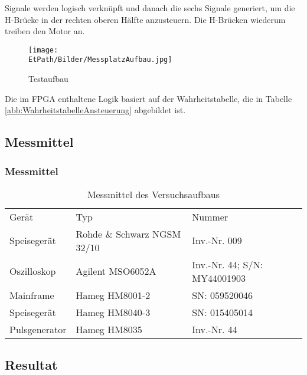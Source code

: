     Signale werden logisch verknüpft und danach die sechs Signale 
    generiert, um die H-Brücke in der rechten oberen Hälfte anzusteuern. 
    Die H-Brücken wiederum treiben den Motor an.
    \begin{figure}[h!]
       	\texttt{[image: \\EtPath/Bilder/MessplatzAufbau.jpg]}
       	\centering
       	\caption{Testaufbau} 
        \label{abb:MessplatzAufbau}
    \end{figure}
    Die im FPGA enthaltene Logik basiert auf der Wahrheitstabelle, die in 
    Tabelle \ref{abb:WahrheitstabelleAnsteuerung} abgebildet ist.

\ifSTANDALONE
\subsection{Messmittel}
\fi
\ifEMBED
\subsubsection{Messmittel}
\fi
    \begin{table}[h!]
        \centering
        \begin{tabular}{lll}
            \rowcolor{gray}
            Gerät &
                Typ &
                Nummer \\
            Speisegerät & 
                Rohde \& Schwarz NGSM 32/10 &
                Inv.-Nr. 009 \\
            Oszilloskop &
                Agilent MSO6052A &
                Inv.-Nr. 44; S/N: MY44001903 \\
            Mainframe &
                Hameg HM8001-2 &
                SN: 059520046 \\
            Speisegerät &
                Hameg HM8040-3 &
                SN: 015405014 \\
            Pulsgenerator &
                Hameg HM8035 &
                Inv.-Nr. 44 \\
        \end{tabular}
        \caption{Messmittel des Versuchsaufbaus}
    \end{table}

\ifSTANDALONE
\subsection{Resultat}
\label{chap:VersuchsResultat}
\fi
\ifEMBED
